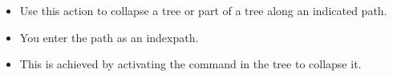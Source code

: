 \begin{itemize}
\item Use this action to collapse a tree or part of a tree along an indicated path.
\item You enter the path as an indexpath.
\item This is achieved by activating the command in the tree to collapse it. 
\end{itemize}
